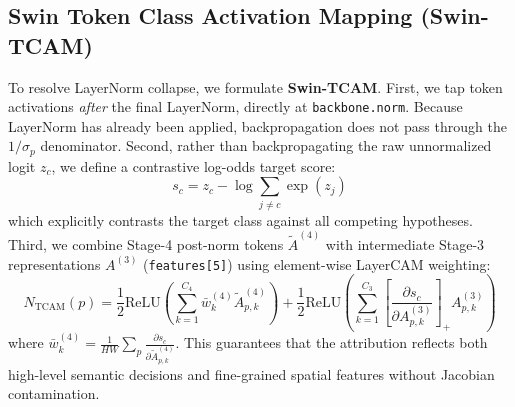 \documentclass[11pt,a4paper]{article}
\begin{document}
\subsection{Swin Token Class Activation Mapping (Swin-TCAM)}
To resolve LayerNorm collapse, we formulate \textbf{Swin-TCAM}. First, we tap token activations \emph{after} the final LayerNorm, directly at \texttt{backbone.norm}. Because LayerNorm has already been applied, backpropagation does not pass through the $1/\sigma_p$ denominator. Second, rather than backpropagating the raw unnormalized logit $z_c$, we define a contrastive log-odds target score:
\begin{equation}
\label{eq:log_odds}
s_c = z_c - \log \sum_{j \neq c} \exp(z_j)
\end{equation}
which explicitly contrasts the target class against all competing hypotheses. Third, we combine Stage-4 post-norm tokens $\tilde{A}^{(4)}$ with intermediate Stage-3 representations $A^{(3)}$ (\texttt{features[5]}) using element-wise LayerCAM weighting:
\begin{equation}
\label{eq:swin_tcam}
N_{\text{TCAM}}(p) = \frac{1}{2} \text{ReLU}\left( \sum_{k=1}^{C_4} \bar{w}_k^{(4)} \tilde{A}_{p,k}^{(4)} \right) + \frac{1}{2} \text{ReLU}\left( \sum_{k=1}^{C_3} \left[ \frac{\partial s_c}{\partial A_{p,k}^{(3)}} \right]_+ A_{p,k}^{(3)} \right)
\end{equation}
where $\bar{w}_k^{(4)} = \frac{1}{HW}\sum_p \frac{\partial s_c}{\partial \tilde{A}_{p,k}^{(4)}}$. This guarantees that the attribution reflects both high-level semantic decisions and fine-grained spatial features without Jacobian contamination.
\end{document}
